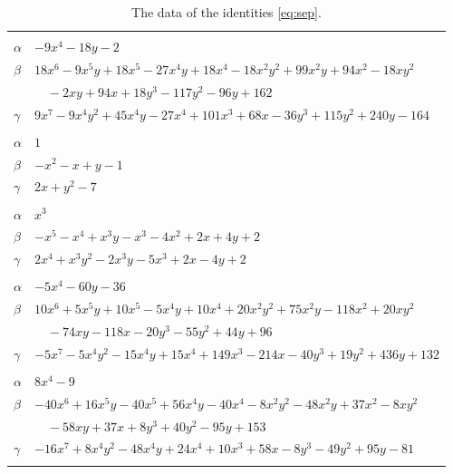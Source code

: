 \documentclass[11pt]{article}
\begin{document}
\begingroup\footnotesize
\setlength{\LTcapwidth}{\textwidth}
\begin{longtable}{@{}ll@{}}
\caption{The data of the identities \eqref{eq:sep}.}\label{tab:sep}\\
\hline\endfirsthead\hline\endhead\hline\endfoot
\multicolumn{2}{@{}l}{$\{i,j\}=\{0,2\}$, $k_{ij}=2$}\\
$\alpha$ & $-9x^{4}-18y-2$\\
$\beta$ & $18x^{6}-9x^{5}y+18x^{5}-27x^{4}y+18x^{4}-18x^{2}y^{2}+99x^{2}y+94x^{2}-18xy^{2}$\\
 & $\quad -2xy+94x+18y^{3}-117y^{2}-96y+162$\\
$\gamma$ & $9x^{7}-9x^{4}y^{2}+45x^{4}y-27x^{4}+101x^{3}+68x-36y^{3}+115y^{2}+240y-164$\\
\addlinespace[3pt]
\multicolumn{2}{@{}l}{$\{i,j\}=\{0,3\}$, $k_{ij}=2\cdot 3$}\\
$\alpha$ & $1$\\
$\beta$ & $-x^{2}-x+y-1$\\
$\gamma$ & $2x+y^{2}-7$\\
\addlinespace[3pt]
\multicolumn{2}{@{}l}{$\{i,j\}=\{0,4\}$, $k_{ij}=2$}\\
$\alpha$ & $x^{3}$\\
$\beta$ & $-x^{5}-x^{4}+x^{3}y-x^{3}-4x^{2}+2x+4y+2$\\
$\gamma$ & $2x^{4}+x^{3}y^{2}-2x^{3}y-5x^{3}+2x-4y+2$\\
\addlinespace[3pt]
\multicolumn{2}{@{}l}{$\{i,j\}=\{0,5\}$, $k_{ij}=2^{2}\cdot 3^{2}$}\\
$\alpha$ & $-5x^{4}-60y-36$\\
$\beta$ & $10x^{6}+5x^{5}y+10x^{5}-5x^{4}y+10x^{4}+20x^{2}y^{2}+75x^{2}y-118x^{2}+20xy^{2}$\\
 & $\quad -74xy-118x-20y^{3}-55y^{2}+44y+96$\\
$\gamma$ & $-5x^{7}-5x^{4}y^{2}-15x^{4}y+15x^{4}+149x^{3}-214x-40y^{3}+19y^{2}+436y+132$\\
\addlinespace[3pt]
\multicolumn{2}{@{}l}{$\{i,j\}=\{0,6\}$, $k_{ij}=3^{2}$}\\
$\alpha$ & $8x^{4}-9$\\
$\beta$ & $-40x^{6}+16x^{5}y-40x^{5}+56x^{4}y-40x^{4}-8x^{2}y^{2}-48x^{2}y+37x^{2}-8xy^{2}$\\
 & $\quad -58xy+37x+8y^{3}+40y^{2}-95y+153$\\
$\gamma$ & $-16x^{7}+8x^{4}y^{2}-48x^{4}y+24x^{4}+10x^{3}+58x-8y^{3}-49y^{2}+95y-81$\\
\addlinespace[3pt]
\multicolumn{2}{@{}l}{$\{i,j\}=\{0,9\}$, $k_{ij}=3^{4}$}\\

\end{longtable}
\end{document}
